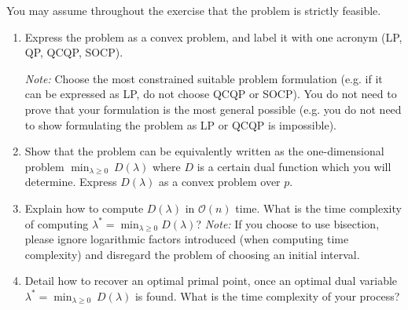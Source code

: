 \documentclass[11pt]{article}
\begin{document}
You may assume throughout the exercise that the problem is strictly feasible.
\begin{enumerate}
    \item Express the problem as a convex problem, and label it with one acronym (LP, QP, QCQP, SOCP).

    \textit{Note: } Choose the most constrained suitable problem formulation (e.g. if it can be expressed as LP, do not choose QCQP or SOCP). You do not need to prove that your formulation is the most general possible (e.g. you do not need to show formulating the problem as LP or QCQP is impossible).

    \item Show that the problem can be equivalently written as the one-dimensional problem $\min_{\lambda \ge 0} \: D(\lambda) $ where $D$ is a certain dual function which you will determine. Express $D(\lambda)$ as a convex problem over $p$.

    \item Explain how to compute $D(\lambda)$ in $\mathcal{O}(n)$ time. What is the time complexity of computing $\lambda^*= \min_{\lambda\geq 0} D(\lambda)$?
    \textit{Note: } If you choose to use bisection, please ignore logarithmic factors introduced (when computing time complexity) and disregard the problem of choosing an initial interval.

    \item Detail how to recover an optimal primal point, once an optimal dual variable $\lambda^* =\min_{\lambda \ge 0} \: D(\lambda)$ is found. What is the time complexity of your process?
\end{enumerate}
\end{document}
